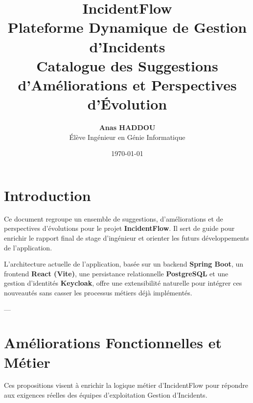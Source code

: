 \documentclass[12pt,a4paper]{article}
\title{
    \vspace{1cm}
    \textbf{\Huge IncidentFlow}\\[0.5cm]
    \Large Plateforme Dynamique de Gestion d'Incidents\\[1.5cm]
    \textbf{\Large Catalogue des Suggestions d'Améliorations et Perspectives d'Évolution}
    \vspace{1.5cm}
}
\author{\textbf{Anas HADDOU} \\ Élève Ingénieur en Génie Informatique}
\date{\today}
\begin{document}
\maketitle
\thispagestyle{empty}
\clearpage

\tableofcontents
\clearpage

\section{Introduction}
Ce document regroupe un ensemble de suggestions, d'améliorations et de perspectives d'évolutions pour le projet \textbf{IncidentFlow}. Il sert de guide pour enrichir le rapport final de stage d'ingénieur et orienter les futurs développements de l'application. 

L'architecture actuelle de l'application, basée sur un backend \textbf{Spring Boot}, un frontend \textbf{React (Vite)}, une persistance relationnelle \textbf{PostgreSQL} et une gestion d'identités \textbf{Keycloak}, offre une extensibilité naturelle pour intégrer ces nouveautés sans casser les processus métiers déjà implémentés.

---

\section{Améliorations Fonctionnelles et Métier}
Ces propositions visent à enrichir la logique métier d'IncidentFlow pour répondre aux exigences réelles des équipes d'exploitation Gestion d'Incidents.
\end{document}
